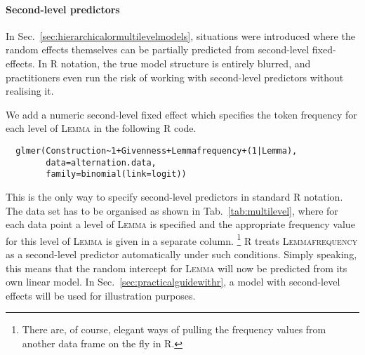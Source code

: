 \paragraph{Second-level predictors}

In Sec.~\ref{sec:hierarchicalormultilevelmodels}, situations were introduced where the random effects themselves can be partially predicted from second-level fixed-effects.
In R notation, the true model structure is entirely blurred, and practitioners even run the risk of working with second-level predictors without realising it.

We add a numeric second-level fixed effect which specifies the token frequency for each level of \textsc{Lemma} in the following R code.

\begin{lstlisting}
  glmer(Construction~1+Givenness+Lemmafrequency+(1|Lemma),
        data=alternation.data,
        family=binomial(link=logit))
\end{lstlisting}

This is the only way to specify second-level predictors in standard R notation.
The data set has to be organised as shown in Tab.~\ref{tab:multilevel}, where for each data point a level of \textsc{Lemma} is specified and the appropriate frequency value for this level of \textsc{Lemma} is given in a separate column.%
\footnote{There are, of course, elegant ways of pulling the frequency values from another data frame on the fly in R.}
R treats \textsc{Lemmafrequency} as a second-level predictor automatically under such conditions.
Simply speaking, this means that the random intercept for \textsc{Lemma} will now be predicted from its own linear model.
In Sec.~\ref{sec:practicalguidewithr}, a model with second-level effects will be used for illustration purposes.


